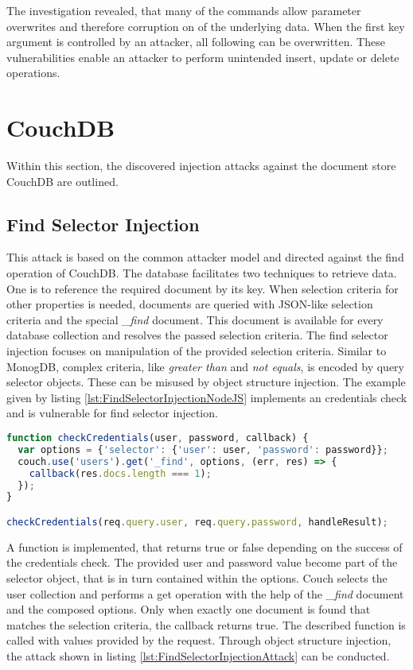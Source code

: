 The investigation revealed, that many of the commands allow parameter overwrites and therefore corruption on of the underlying data. When the first key argument is controlled by an attacker, all following can be overwritten. These vulnerabilities enable an attacker to perform unintended insert, update or delete operations.

\section{CouchDB}
Within this section, the discovered injection attacks against the document store CouchDB are outlined.

\subsection{Find Selector Injection}
This attack is based on the common attacker model and directed against the find operation of CouchDB. The database facilitates two techniques to retrieve data. One is to reference the required document by its key. When selection criteria for other properties is needed, documents are queried with JSON-like selection criteria and the special \emph{\_find} document. This document is available for every database collection and resolves the passed selection criteria. The find selector injection focuses on manipulation of the provided selection criteria. Similar to MonogDB, complex criteria, like \emph{greater than} and \emph{not equals}, is encoded by query selector objects. These can be misused by object structure injection. The example given by listing \ref{lst:FindSelectorInjectionNodeJS} implements an credentials check and is vulnerable for find selector injection. \\

\begin{lstlisting}[caption={Vulnerable NodeJS example for find selector injection on CouchDB}, label={lst:FindSelectorInjectionNodeJS}, language=JavaScript]
function checkCredentials(user, password, callback) {
  var options = {'selector': {'user': user, 'password': password}};
  couch.use('users').get('_find', options, (err, res) => {
    callback(res.docs.length === 1);
  });
}

checkCredentials(req.query.user, req.query.password, handleResult);
\end{lstlisting}

A function is implemented, that returns true or false depending on the success of the credentials check. The provided user and password value become part of the selector object, that is in turn contained within the options. Couch selects the user collection and performs a get operation with the help of the \emph{\_find} document and the composed options. Only when exactly one document is found that matches the selection criteria, the callback returns true. The described function is called with values provided by the request. Through object structure injection, the attack shown in listing \ref{lst:FindSelectorInjectionAttack} can be conducted. \\

